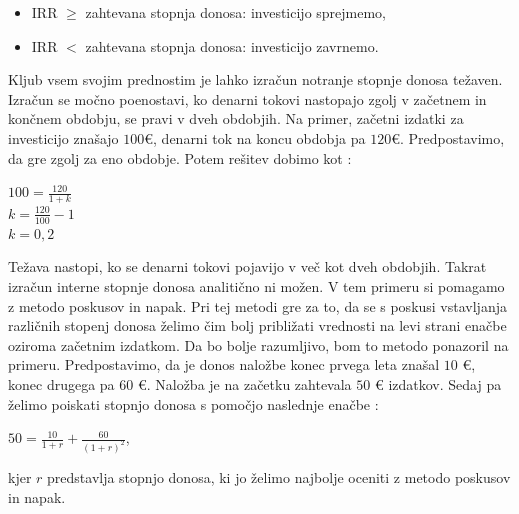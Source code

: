 \begin{itemize}
\item IRR $\geq$ zahtevana stopnja donosa: investicijo sprejmemo,
\item IRR $<$ zahtevana stopnja donosa: investicijo zavrnemo.
\end{itemize}


Kljub vsem svojim prednostim je lahko izračun notranje stopnje donosa težaven. Izračun se močno poenostavi, ko denarni tokovi nastopajo zgolj v začetnem in končnem obdobju, se pravi v dveh obdobjih. Na primer, začetni izdatki za investicijo znašajo $100$€, denarni tok na koncu obdobja pa $120$€. Predpostavimo, da gre zgolj za eno obdobje. Potem rešitev dobimo kot \cite[str. 157]{Mramor}:\\

\begin{center}
$100 = \tfrac{120}{1+k}$\\[0,5cm]
$k = \tfrac{120}{100} - 1$\\[0,5 cm]
$k = 0,2$
\end{center}

Težava nastopi, ko se denarni tokovi pojavijo v več kot dveh obdobjih. Takrat izračun interne stopnje donosa analitično ni možen. V tem primeru si pomagamo z metodo poskusov in napak. Pri tej metodi gre za to, da se s poskusi vstavljanja različnih stopenj donosa želimo čim bolj približati vrednosti na levi strani enačbe oziroma začetnim izdatkom. Da bo bolje razumljivo, bom to metodo ponazoril na primeru. Predpostavimo, da je donos naložbe konec prvega leta znašal $10$ €, konec drugega pa $60$ €. Naložba je na začetku zahtevala $50$ € izdatkov. Sedaj pa želimo poiskati stopnjo donosa s pomočjo naslednje enačbe \cite[str. 158]{Mramor}:\\

\begin{center}
$50 = \tfrac{10}{1+r} + \tfrac{60}{(1+r)^2}$,
\end{center}
kjer $r$ predstavlja stopnjo donosa, ki jo želimo najbolje oceniti z metodo poskusov in napak.

